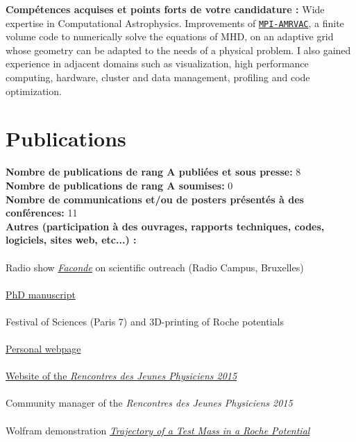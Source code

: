 \documentclass[11pt]{article}
\begin{document}
\vspace{-0.1cm}

{\bf Comp\'etences acquises et points forts de votre candidature :}  
Wide expertise in Computational Astrophysics. Improvements of \href{http://amrvac.org/}{\texttt{MPI-AMRVAC}}, a finite volume code to numerically solve the equations of MHD, on an adaptive grid whose geometry can be adapted to the needs of a physical problem. I also gained experience in adjacent domains such as visualization, high performance computing, hardware, cluster and data management, profiling and code optimization.

\newpage


\section*{Publications}
\vspace{0.3cm}


{\bf Nombre de publications de rang A publi\'ees et sous presse:} 8 \\
 
{\bf Nombre de publications de rang A soumises:} 0 \\

{\bf Nombre de communications et/ou de posters pr\'esent\'es \`a des
  conf\'erences:} 11 \\
  
{\bf Autres (participation \`a des ouvrages, rapports techniques, codes, logiciels, sites web, etc...) :}\\ \\
 Radio show \href{https://www.mixcloud.com/faconde/faconde-s2e01-vulgarisation/}{\emph{Faconde}} on scientific outreach (Radio Campus, Bruxelles)\\ \\
 \href{http://adsabs.harvard.edu/abs/2017arXiv170709165E}{PhD manuscript}\\ \\
 Festival of Sciences (Paris 7) and 3D-printing of Roche potentials \\ \\
 \href{http://homes.esat.kuleuven.be/~ileyk}{Personal webpage}\\ \\
 \href{http://rjp.sfp-paris.fr/index2015.html}{Website of the \emph{Rencontres des Jeunes Physiciens 2015}}\\ \\
 Community manager of the \emph{Rencontres des Jeunes Physiciens 2015}\\ \\
 Wolfram demonstration \href{http://demonstrations.wolfram.com/TrajectoryOfATestMassInARochePotential/}{\textit{Trajectory of a Test Mass in a Roche Potential}}\\
\vspace{0.3cm}
\end{document}
